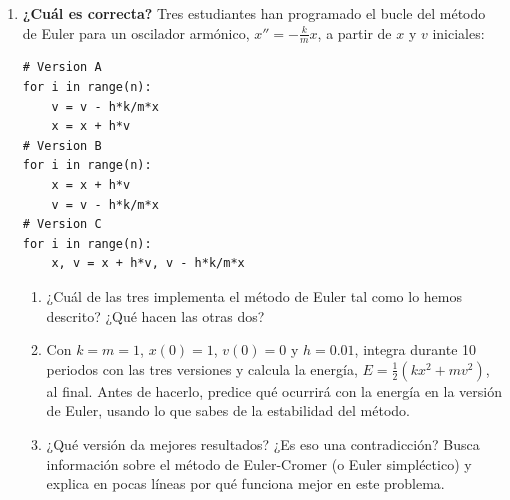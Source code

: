 \begin{enumerate}
\item \label{ej:cual_euler} \textbf{¿Cuál es correcta?} Tres estudiantes han programado el bucle del método de Euler para un oscilador armónico, $x''=-\frac{k}{m}x$, a partir de $x$ y $v$ iniciales:
\begin{verbatim}
# Version A
for i in range(n):
    v = v - h*k/m*x
    x = x + h*v
# Version B
for i in range(n):
    x = x + h*v
    v = v - h*k/m*x
# Version C
for i in range(n):
    x, v = x + h*v, v - h*k/m*x
\end{verbatim}
\begin{enumerate}
\item ¿Cuál de las tres implementa el método de Euler tal como lo hemos descrito? ¿Qué hacen las otras dos?
\item Con $k=m=1$, $x(0)=1$, $v(0)=0$ y $h=0.01$, integra durante 10 periodos con las tres versiones y calcula la energía, $E=\frac12(kx^2+mv^2)$, al final. Antes de hacerlo, predice qué ocurrirá con la energía en la versión de Euler, usando lo que sabes de la estabilidad del método.
\item ¿Qué versión da mejores resultados? ¿Es eso una contradicción? Busca información sobre el método de Euler-Cromer (o Euler simpléctico) y explica en pocas líneas por qué funciona mejor en este problema.
\end{enumerate}


\end{enumerate}
